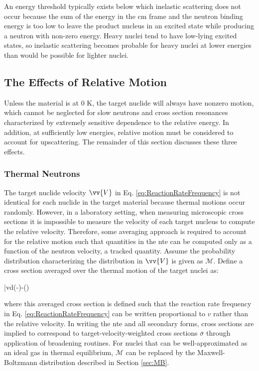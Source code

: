 An energy threshold typically exists below which inelastic scattering does not occur because the sum of the energy in the \gls{cm} frame and the neutron binding energy is too low to leave the product nucleus in an excited state while producing a neutron with non-zero energy. Heavy nuclei tend to have low-lying excited states, so inelastic scattering becomes probable for heavy nuclei at lower energies than would be possible for lighter nuclei. 

\subsection{The Effects of Relative Motion}
\label{sec:ThermalEffects}

Unless the material is at 0 K, the target nuclide will always have nonzero motion, which cannot be neglected for slow neutrons and cross section resonances characterized by extremely sensitive dependence to the relative energy. In addition, at sufficiently low energies, relative motion must be considered to account for upscattering. The remainder of this section discusses these three effects.

\subsubsection{Thermal Neutrons}
\label{sec:ThermalNeutrons}

The target nuclide velocity \(\vv{V}\) in Eq. \eqref{eq:ReactionRateFrequency} is not identical for each nuclide in the target material because thermal motions occur randomly. However, in a laboratory setting, when measuring microscopic cross sections it is impossible to measure the velocity of each target nucleus to compute the relative velocity. Therefore, some averaging approach is required to account for the relative motion such that quantities in the \gls{nte} can be computed only as a function of the neutron velocity, a tracked quantity. Assume the probability distribution characterizing the distribution in \(\vv{V}\) is given as \(\mathscr{M}\). Define a cross section averaged over the thermal motion of the target nuclei as:

\beq
\label{eq:OneOverV}
\bar{\sigma}v\equiv\int d\sigma\left(\left\Vert{}-\right\Vert\right)\left\Vert{}-\right\Vert{}()
\eeq

where this averaged cross section is defined such that the reaction rate frequency in Eq. \eqref{eq:ReactionRateFrequency} can be written proportional to \(v\) rather than the relative velocity. In writing the \gls{nte} and all secondary forms, cross sections are implied to correspond to target-velocity-weighted cross sections \(\bar{\sigma}\) through application of broadening routines. For nuclei that can be well-approximated as an ideal gas in thermal equilibrium, \(\mathscr{M}\) can be replaced by the Maxwell-Boltzmann distribution described in Section \ref{sec:MB}.

